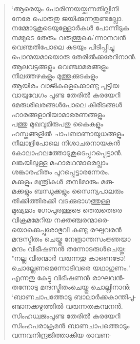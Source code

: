 \begin{verse}
‘ആരെയും പോരിന്നയയ്ക്കുന്നതില്ലിനി\\
നേരേ പൊരുതു ജയിക്കുന്നതുണ്ടല്ലോ.\\
നമ്മോടുകൂടെയുള്ളോര്‍കള്‍ പോന്നീടുക\\
നമ്മുടെ തേരും വരുത്തുകെ’ന്നാനവന്‍\\
വെണ്മതിപോലെ കുടയും പിടിപ്പിച്ചു\\
പൊന്മയമായൊരു തേരില്‍ക്കരേറിനാന്‍.\\
ആലവട്ടങ്ങളും വെഞ്ചാമരങ്ങളും\\
നീലത്തഴകളും മുത്തുക്കുടകളും\\
ആയിരം വാജികളെക്കൊണ്ടു പൂട്ടിയ\\
വായുവേഗം പൂണ്ട തേരില്‍ കരയേറി\\
മേരുശിഖരങ്ങള്‍പോലെ കിരീടങ്ങള്‍\\
ഹാരങ്ങളാദിയാമാഭരണങ്ങളും\\
പത്തു മുഖവുമിരുപതു കൈകളും\\
ഹസ്തങ്ങളില്‍ ചാപബാണായുധങ്ങളും\\
നീലാദ്രിപോലെ നിശാചരനായകന്‍\\
കോലാഹലത്തോടുകൂടെപ്പുറപ്പെട്ടാന്‍.\\
ലങ്കയിലുള്ള മഹാരഥന്മാരെല്ലാം\\
ശങ്കാരഹിതം പുറപ്പെട്ടാരന്നേരം.\\
മക്കളും മന്ത്രികള്‍ തമ്പിമാരും മരു-\\
മക്കളും ബന്ധുക്കളും സൈന്യപാലരും\\
തിക്കിത്തിരക്കി വടക്കുഭാഗത്തുള്ള\\
മുഖ്യമാം ഗോപുരത്തൂടെ തെരുതെരെ\\
വിക്രമമേറിയ നക്തഞ്ചരന്മാരെ-\\
യൊക്കെപ്പുരോഭുവി കണ്ടു രഘുവരന്‍\\
മന്ദസ്മിതം ചെയ്തു നേത്രാന്തസംജ്ഞയാ\\
മന്ദം വിഭീഷണന്‍ തന്നോടരുള്‍ചെയ്തു:\\
"നല്ല വീരന്മാര്‍ വരുന്നതു കാണെടോ!\\
ചൊല്ലേണമെന്നോടിവരെ യഥാഗുണം."\\
എന്നതു കേട്ടു വിഭീഷണന്‍ രാഘവന്‍-\\
തന്നോടു മന്ദസ്മിതംചെയ്തു ചൊല്ലിനാന്‍:\\
‘ബാണചാപത്തോടു ബാലാര്‍ക്കകാന്തിപൂ-\\
ണ്ടാനക്കഴുത്തില്‍ വരുന്നതകമ്പനന്‍.\\
സിംഹധ്വജംപൂണ്ട തേരില്‍ കരയേറി\\
സിംഹപരാക്രമന്‍ ബാണചാപത്തൊടും\\
വന്നവനിന്ദ്രജിത്താകിയ രാവണ-\\

\end{verse}
